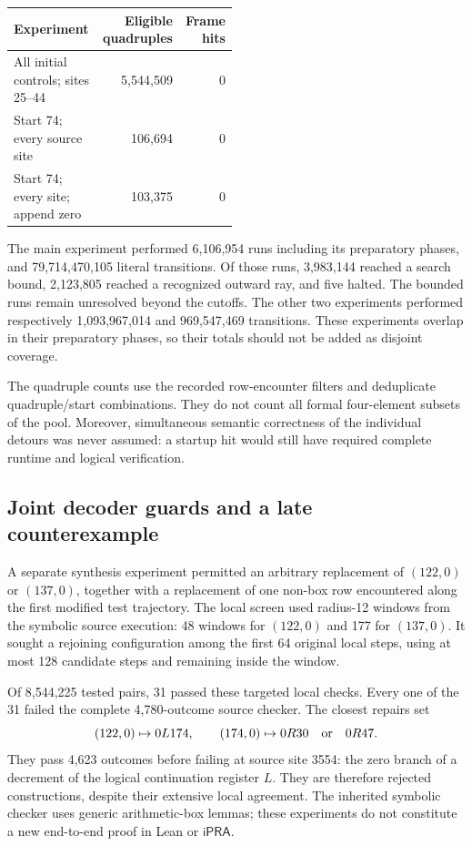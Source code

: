 \begin{center}
\small
\begin{tabular}{@{}p{0.49\linewidth}rr@{}}
\hline
Experiment & Eligible quadruples & Frame hits\\
\hline
All initial controls; sites 25--44 & 5,544,509 & 0\\
Start 74; every source site & 106,694 & 0\\
Start 74; every site; append zero & 103,375 & 0\\
\hline
\end{tabular}
\end{center}

The main experiment performed 6,106,954 runs including its preparatory
phases, and 79,714,470,105 literal transitions. Of those runs, 3,983,144
reached a search bound, 2,123,805 reached a recognized outward ray, and five
halted. The bounded runs remain unresolved beyond the cutoffs. The other
two experiments performed respectively 1,093,967,014 and 969,547,469
transitions. These experiments overlap in their preparatory phases, so
their totals should not be added as disjoint coverage.

The quadruple counts use the recorded row-encounter filters and deduplicate
quadruple/start combinations. They do not count all formal four-element
subsets of the pool. Moreover, simultaneous semantic correctness of the
individual detours was never assumed: a startup hit would still have
required complete runtime and logical verification.

\subsection{Joint decoder guards and a late counterexample}

A separate synthesis experiment permitted an arbitrary replacement of
\((122,0)\) or \((137,0)\), together with a replacement of one non-box row
encountered along the first modified test trajectory. The local screen used
radius-12 windows from the symbolic source execution: 48 windows for
\((122,0)\) and 177 for \((137,0)\). It sought a rejoining configuration
among the first 64 original local steps, using at most 128 candidate steps
and remaining inside the window.

Of 8,544,225 tested pairs, 31 passed these targeted local checks. Every one
of the 31 failed the complete 4,780-outcome source checker. The closest
repairs set
\[
 (122,0)\mapsto0L174,\qquad
 (174,0)\mapsto0R30
 \quad\hbox{or}\quad 0R47.
\]
They pass 4,623 outcomes before failing at source site 3554: the zero branch
of a decrement of the logical continuation register \(L\). They are
therefore rejected constructions, despite their extensive local agreement.
The inherited symbolic checker uses generic arithmetic-box lemmas; these
experiments do not constitute a new end-to-end proof in Lean or
\(\mathsf{iPRA}\).

